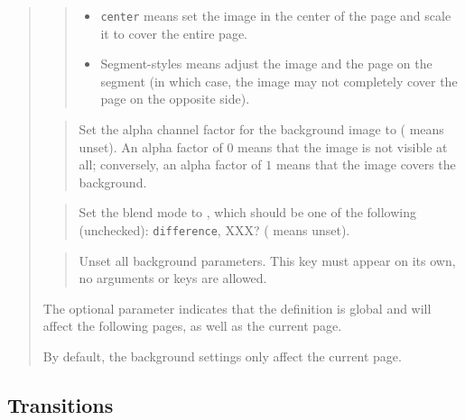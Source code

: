 \documentclass[12pt]{article}
\begin{document}
\begin{quote}
\begin{quote}
\begin {itemize}
\item {\tt center} means set the image in the center of the page and
scale it to cover the entire page.

\item Segment-styles means adjust the image and the page on the
segment (in which case, the image may not completely cover the page on
the opposite side).

\end {itemize}
\end{quote}

\begin{quote}
Set the alpha channel factor for the background image to 
( means unset). An alpha factor of $0$ means that the
image is not visible at all; conversely, an alpha factor of $1$ means that the
image covers the background.
\end{quote}

\begin{quote}
Set the blend mode to , which should be one of the
following (unchecked): {\tt difference}, XXX?
( means unset).
\end{quote}

\goodbreak
{}
\begin{quote}
Unset all background parameters.
This key must appear on its own, no arguments or keys are allowed. 
\end{quote}
The optional parameter  indicates that
the definition is global and will affect the following pages, 
as well as the current page.

By default, the background settings only affect the current page.
\end{quote}

\subsection {Transitions}
\end{document}
